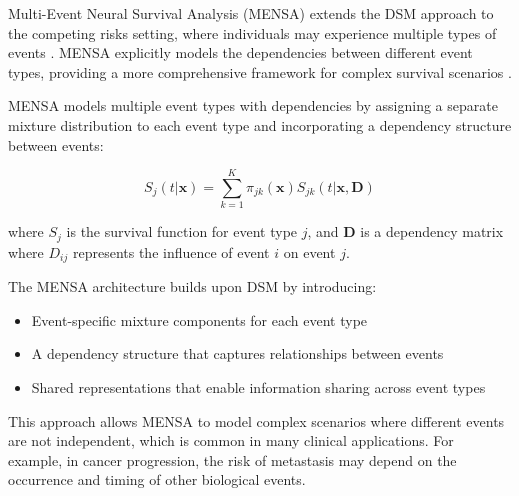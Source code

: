 Multi-Event Neural Survival Analysis (MENSA) extends the DSM approach to the competing risks setting, where individuals may experience multiple types of events \parencite{zhong2021,austin2016}. MENSA explicitly models the dependencies between different event types, providing a more comprehensive framework for complex survival scenarios \parencite{fine1999,prentice1978}.

\begin{definitionbox}[title=Multi-Event Neural Survival Analysis]
  MENSA models multiple event types with dependencies by assigning a separate mixture distribution to each event type and incorporating a dependency structure between events:

  \begin{equation}
    S_j(t|\mathbf{x}) = \sum_{k=1}^K \pi_{jk}(\mathbf{x}) S_{jk}(t|\mathbf{x}, \mathbf{D})
  \end{equation}

  where $S_j$ is the survival function for event type $j$, and $\mathbf{D}$ is a dependency matrix where $D_{ij}$ represents the influence of event $i$ on event $j$.
\end{definitionbox}

The MENSA architecture builds upon DSM by introducing:
\begin{itemize}
\item Event-specific mixture components for each event type
\item A dependency structure that captures relationships between events
\item Shared representations that enable information sharing across event types
\end{itemize}

This approach allows MENSA to model complex scenarios where different events are not independent, which is common in many clinical applications. For example, in cancer progression, the risk of metastasis may depend on the occurrence and timing of other biological events.

